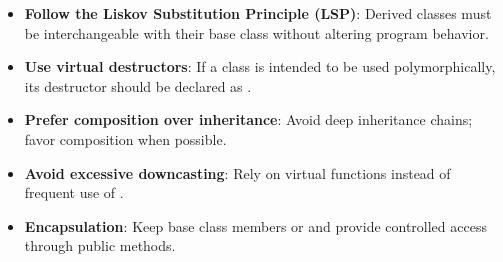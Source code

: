 \begin{tipsblock}
    \begin{itemize}
        \item \textbf{Follow the Liskov Substitution Principle (LSP)}: Derived classes must be interchangeable with their base class without altering program behavior.
        \item \textbf{Use virtual destructors}: If a class is intended to be used polymorphically, its destructor should be declared as .
        \item \textbf{Prefer composition over inheritance}: Avoid deep inheritance chains; favor composition when possible.
        \item \textbf{Avoid excessive downcasting}: Rely on virtual functions instead of frequent use of .
        \item \textbf{Encapsulation}: Keep base class members  or  and provide controlled access through public methods.
    \end{itemize}
\end{tipsblock}

